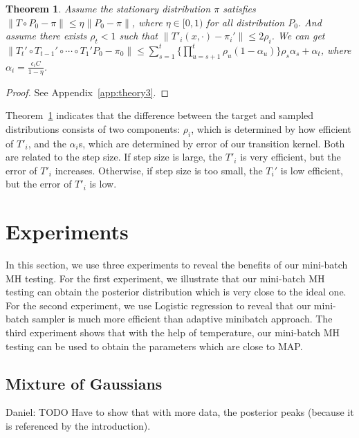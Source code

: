 \documentclass{article}
\newtheorem{theorem}{Theorem}
\begin{document}
\begin{theorem}\label{thm:theory3}
Assume the stationary distribution $\pi$ satisfies $\|T \circ P_0 - \pi\| \leq \eta \|P_0 - \pi\|$,
where $\eta \in [0, 1)$ for all distribution $P_0$. And assume there exists $\rho_t < 1$ such that
$\|T'_i(x, \cdot) - \pi_i'\| \leq 2\rho_i$. We can get $\| T_t' \circ T_{t-1}' \circ \cdots \circ T_1' P_0
- \pi_0 \| \leq \sum_{s=1}^t \{\prod _{u=s+1}^t \rho_u (1-\alpha_u)\} \rho_s \alpha_s + \alpha_t $,
where $\alpha_i = \frac{\epsilon_i C }{1-\eta}$.
\end{theorem}

\begin{proof}
See Appendix~\ref{app:theory3}.
\end{proof}

Theorem~\ref{thm:theory3} indicates that the difference between the target and sampled distributions
consists of two components: $\rho_i$, which is determined by how efficient of $T'_i$, and the
$\alpha_i$s, which are determined by error of our transition kernel. Both are related to the step
size. If step size is large, the $T'_i$ is very efficient, but the error of $T'_i$ increases.
Otherwise, if step size is too small, the $T_i'$ is low efficient, but the error of $T'_i$ is low.





\section{Experiments}\label{sec:experiments}

In this section, we use three experiments to reveal the benefits of our mini-batch MH testing. For
the first experiment, we illustrate that our mini-batch MH testing can obtain the posterior
distribution which is very close to the ideal one. For the second experiment, we use Logistic
regression to reveal that our mini-batch sampler is much more efficient than adaptive minibatch
approach. The third experiment shows that with the help of temperature, our mini-batch MH testing
can be used to obtain the parameters which are close to MAP. 

\subsection{Mixture of Gaussians}\label{ssec:gaussians}

{\color{blue}
Daniel: TODO Have to show that with more data, the posterior peaks (because it is referenced by the
introduction).
}
\end{document}

